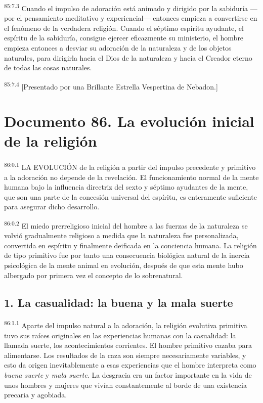 \documentclass[twoside, 11pt]{book}
\begin{document}
\par
\textsuperscript{85:7.3} Cuando el impulso de adoración está animado y dirigido por la sabiduría ---por el pensamiento meditativo y experiencial--- entonces empieza a convertirse en el fenómeno de la verdadera religión. Cuando el séptimo espíritu ayudante, el espíritu de la sabiduría, consigue ejercer eficazmente su ministerio, el hombre empieza entonces a desviar su adoración de la naturaleza y de los objetos naturales, para dirigirla hacia el Dios de la naturaleza y hacia el Creador eterno de todas las cosas naturales.

\par
\textsuperscript{85:7.4} [Presentado por una Brillante Estrella Vespertina de Nebadon.]


\chapter{Documento 86. La evolución inicial de la religión}
\par
\textsuperscript{86:0.1} LA EVOLUCIÓN de la religión a partir del impulso precedente y primitivo a la adoración no depende de la revelación. El funcionamiento normal de la mente humana bajo la influencia directriz del sexto y séptimo ayudantes de la mente, que son una parte de la concesión universal del espíritu, es enteramente suficiente para asegurar dicho desarrollo.

\par
\textsuperscript{86:0.2} El miedo prerreligioso inicial del hombre a las fuerzas de la naturaleza se volvió gradualmente religioso a medida que la naturaleza fue personalizada, convertida en espíritu y finalmente deificada en la conciencia humana. La religión de tipo primitivo fue por tanto una consecuencia biológica natural de la inercia psicológica de la mente animal en evolución, después de que esta mente hubo albergado por primera vez el concepto de lo sobrenatural.

\section*{1. La casualidad: la buena y la mala suerte}
\par
\textsuperscript{86:1.1} Aparte del impulso natural a la adoración, la religión evolutiva primitiva tuvo sus raíces originales en las experiencias humanas con la casualidad: la llamada suerte, los acontecimientos corrientes. El hombre primitivo cazaba para alimentarse. Los resultados de la caza son siempre necesariamente variables, y esto da origen inevitablemente a esas experiencias que el hombre interpreta como \textit{buena suerte} y \textit{mala suerte}. La desgracia era un factor importante en la vida de unos hombres y mujeres que vivían constantemente al borde de una existencia precaria y agobiada.
\end{document}
